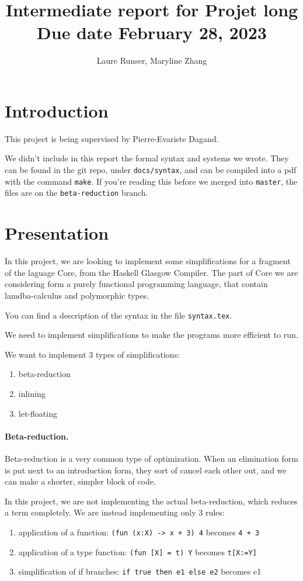 \documentclass{article}
\title{Intermediate report for Projet long\\ Due date February 28, 2023}
\author{Laure Runser, Maryline Zhang}
\begin{document}
\maketitle


\section{Introduction}
This project is being supervised by Pierre-Evariste Dagand.


We didn't include in this report the formal syntax and systems we wrote.
They can be found in the git repo, under {\tt docs/syntax}, and
can be compiled into a pdf with the command {\tt make}.
If you're reading this before we merged into {\tt master}, the files are on the 
{\tt beta-reduction} branch.


\section{Presentation}
In this project, we are looking to implement some simplifications for a fragment of 
the laguage Core, from the Haskell Glasgow Compiler. The part of Core we are 
considering form a purely functional programming language, that contain 
lamdba-calculus and polymorphic types.

You can find a description of the syntax in the file {\tt syntax.tex}.

We need to implement simplifications to make the programs more efficient to run.

We want to implement 3 types of simplifications:
\begin{enumerate}
  \item beta-reduction 
  \item inlining 
  \item let-floating
\end{enumerate}

\paragraph{Beta-reduction.}Beta-reduction is a very common type of optimization.
When an elimination form is put next to an introduction form, they sort of cancel 
each other out, and we can make a shorter, simpler block of code.

In this project, we are not implementing the actual beta-reduction, which reduces a
term completely. We are instead implementing only 3 rules:
\begin{enumerate}
  \item application of a function: {\tt (fun (x:X) -> x + 3) 4} becomes {\tt 4 + 3}
  \item application of a type function: {\tt (fun [X] = t) Y} becomes {\tt t[X:=Y]}
  \item simplification of if branches: {\tt if true then e1 else e2} becomes {e1}
\end{enumerate}
\end{document}
